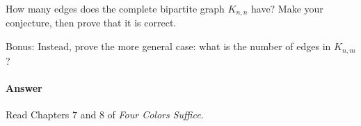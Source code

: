 \documentclass{article}
\begin{document}
\collab{\todo{}} 

How many edges does the complete bipartite graph $K_{n,n}$ have?  Make your
conjecture, then prove that it is correct.

Bonus: Instead, prove the more general case:
what is the number of edges in $K_{n,m}$?

\paragraph{Answer}





 

Read Chapters $7$ and $8$ of \emph{Four Colors Suffice}.
\end{document}
